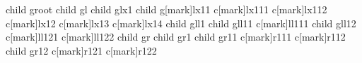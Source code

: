 \documentclass[border=10pt]{standalone}
\begin{document}
  \begin{genealogypicture}[
    template=signpost,
    level distance=10mm,
    level size=8mm,
    node size=15mm,
    box={colback=white,sharp corners,fontupper=\sffamily},
    mark/.style={box={colback=blue!20}},
    edges={foreground={line width=1pt,red,-LaTeX,},background={line width=2pt,white}}
    ]
child{
  g{root}
  child{ g{l}
    child{ g{lx1}
      child{ g[mark]{lx11}
        c[mark]{lx111} c[mark]{lx112}
      }
      c[mark]{lx12} c[mark]{lx13} c[mark]{lx14}
    }
    child{ g{ll1}
      child{ g{ll11}
        c[mark]{ll111}
      }
      child{ g{ll12}
        c[mark]{ll121} c[mark]{ll122}
      }
    }
  }
  child{ g{r}
    child{ g{r1}
      child{ g{r11}
        c[mark]{r111} c[mark]{r112}
      }
      child{ g{r12}
        c[mark]{r121} c[mark]{r122}
      }
    }
  }
}
  \end{genealogypicture}
\end{document}
